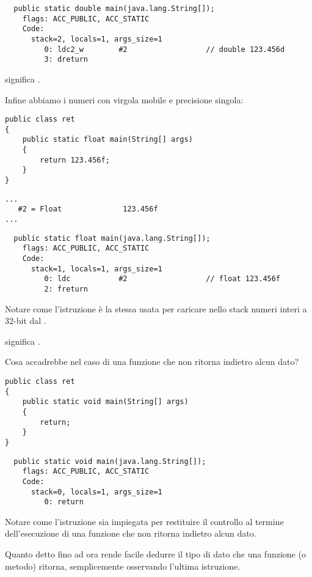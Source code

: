 \begin{lstlisting}
  public static double main(java.lang.String[]);
    flags: ACC_PUBLIC, ACC_STATIC
    Code:
      stack=2, locals=1, args_size=1
         0: ldc2_w        #2                  // double 123.456d
         3: dreturn
\end{lstlisting}

 significa .

Infine abbiamo i numeri con virgola mobile e precisione singola:

\begin{lstlisting}[style=customjava]
public class ret
{
	public static float main(String[] args)
	{
		return 123.456f;
	}
}
\end{lstlisting}

\begin{lstlisting}[caption=Constant pool]
...
   #2 = Float              123.456f
...
\end{lstlisting}

\begin{lstlisting}
  public static float main(java.lang.String[]);
    flags: ACC_PUBLIC, ACC_STATIC
    Code:
      stack=1, locals=1, args_size=1
         0: ldc           #2                  // float 123.456f
         2: freturn
\end{lstlisting}

Notare come l'istruzione  è la stessa usata per caricare nello stack numeri interi a 32-bit dal .

 significa .

Cosa accadrebbe nel caso di una funzione che non ritorna indietro alcun dato?

\begin{lstlisting}[style=customjava]
public class ret
{
	public static void main(String[] args)
	{
		return;
	}
}
\end{lstlisting}

\begin{lstlisting}
  public static void main(java.lang.String[]);
    flags: ACC_PUBLIC, ACC_STATIC
    Code:
      stack=0, locals=1, args_size=1
         0: return
\end{lstlisting}

Notare come l'istruzione  sia impiegata per restituire il controllo al termine dell'esecuzione di una
funzione che non ritorna indietro alcun dato.

Quanto detto fino ad ora rende facile dedurre il tipo di dato che una funzione (o metodo) ritorna,
semplicemente osservando l'ultima istruzione.


